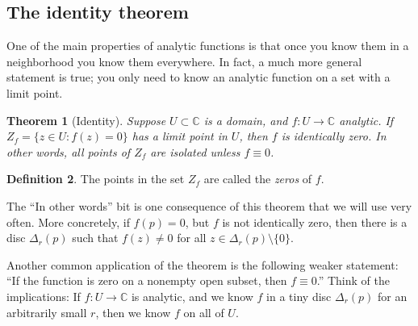 \documentclass[12pt,openany]{book}
\newcommand{\C}{{\mathbb{C}}}
\newcommand{\myquote}[1]{``#1''}
\theoremstyle{plain}
\newtheorem{thm}{Theorem}[section]
\theoremstyle{remark}
\theoremstyle{definition}
\newtheorem{defn}[thm]{Definition}
\theoremstyle{exercise}
\theoremstyle{example}
\begin{document}
\subsection{The identity theorem}

One of the main properties of analytic functions is that once you know them
in a neighborhood you know them everywhere.  In fact, a much more general
statement is true; you only need to know an analytic function on a set with
a limit point.

\begin{thm}[Identity]%
\label{thm:identity}
Suppose $U \subset \C$ is a domain, 
and $f \colon U \to \C$ analytic.
If $Z_f = \bigl\{ z \in U : f(z) = 0 \bigr\}$
has a limit point in $U$, then $f$ is identically zero.
In other words, all points of $Z_f$ are isolated unless $f \equiv 0$.
\end{thm}

\begin{defn}
The points in the set $Z_f$ are called the \emph{zeros} of $f$.
\end{defn}

The \myquote{In other words} bit is
one consequence of this theorem that we will use very often.  More
concretely, if $f(p)=0$, but $f$ is not
identically zero, then there is a disc $\Delta_r(p)$ such that $f(z) \not=
0$ for all $z \in \Delta_r(p) \setminus \{ 0 \}$.

Another common application of the theorem is the following weaker statement:
\myquote{If the function is zero on a nonempty open subset, then $f \equiv 0$.}
Think of the implications:  If $f \colon U \to \C$ is analytic, and we know
$f$ in a tiny disc $\Delta_r(p)$ for an arbitrarily small $r$, then
we know $f$ on all of $U$.
\end{document}
